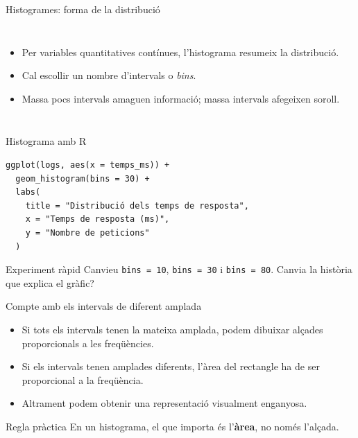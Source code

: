 \documentclass[10pt,aspectratio=169]{beamer}
\newcommand{\important}[1]{\textcolor{UABGreen}{\textbf{#1}}}
\begin{document}
\begin{frame}{Histogrames: forma de la distribució}
\begin{columns}[T]
\begin{itemize}
  \item Per variables quantitatives contínues, l'histograma resumeix la distribució.
  \item Cal escollir un nombre d'intervals o \textit{bins}.
  \item Massa pocs intervals amaguen informació; massa intervals afegeixen soroll.
\end{itemize}
\end{columns}
\end{frame}

\begin{frame}[fragile]{Histograma amb R}
\begin{lstlisting}
ggplot(logs, aes(x = temps_ms)) +
  geom_histogram(bins = 30) +
  labs(
    title = "Distribució dels temps de resposta",
    x = "Temps de resposta (ms)",
    y = "Nombre de peticions"
  )
\end{lstlisting}
\vspace{0.25cm}
\begin{block}{Experiment ràpid}
Canvieu \texttt{bins = 10}, \texttt{bins = 30} i \texttt{bins = 80}. Canvia la història que explica el gràfic?
\end{block}
\end{frame}

\begin{frame}{Compte amb els intervals de diferent amplada}
\begin{itemize}
  \item Si tots els intervals tenen la mateixa amplada, podem dibuixar alçades proporcionals a les freqüències.
  \item Si els intervals tenen amplades diferents, l'àrea del rectangle ha de ser proporcional a la freqüència.
  \item Altrament podem obtenir una representació visualment enganyosa.
\end{itemize}
\vspace{0.3cm}
\begin{block}{Regla pràctica}
En un histograma, el que importa és l'\important{àrea}, no només l'alçada.
\end{block}
\end{frame}
\end{document}
